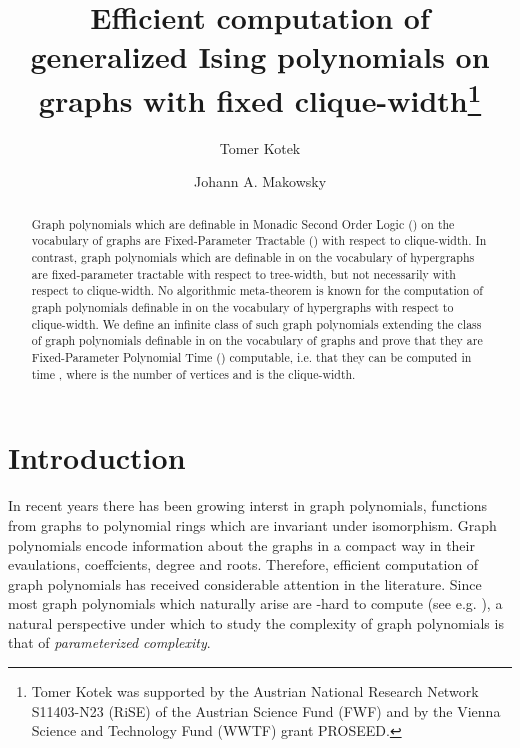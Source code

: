 \documentclass{llncs}
\begin{document}
\title{Efficient computation of generalized Ising polynomials on graphs
with fixed clique-width\thanks{Tomer Kotek was supported by the Austrian
National Research Network S11403-N23 (RiSE) of the Austrian Science
Fund (FWF) and by the Vienna Science and Technology Fund (WWTF)
grant PROSEED. }}
\author{Tomer Kotek \and Johann A. Makowsky}

\maketitle
\begin{abstract}
Graph polynomials which are definable in 
Monadic Second
Order Logic () on the vocabulary
of graphs are Fixed-Parameter Tractable () with respect to clique-width.
In contrast, graph polynomials which are definable in  on the vocabulary of hypergraphs are 
fixed-parameter tractable
with respect to tree-width, but not necessarily
with respect to clique-width. No algorithmic meta-theorem is known
for the computation of graph polynomials definable in  on
the vocabulary of hypergraphs with respect to clique-width. We define an infinite class of such graph
polynomials extending the class of graph polynomials definable in
 on the vocabulary of graphs and prove that they are Fixed-Parameter 
Polynomial Time () computable, i.e. that they can be computed
in time , where  is the number of vertices and 
is the clique-width. 
\end{abstract}

\section{Introduction}

In recent years there has been growing interst in graph polynomials,
functions from graphs to polynomial rings which are invariant under
isomorphism. Graph polynomials encode information about the graphs
in a compact way in their evaulations, coeffcients, degree and roots.
Therefore, efficient computation of graph polynomials has received
considerable attention in the literature. Since most graph polynomials
which naturally arise are -hard to compute (see e.g. \cite{valiant1979complexity,ar:JVW90,pr:BH08}),
a natural perspective under which to study the complexity of graph polynomials
is that of {\em parameterized complexity}. 
\end{document}
